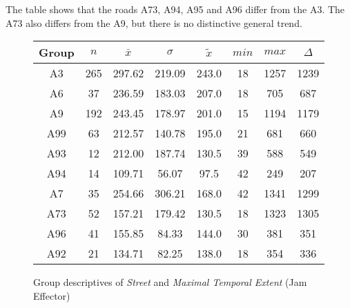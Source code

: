 The table shows that the roads A73, A94, A95 and A96 differ from the A3. The A73 also differs from the A9, but there is no distinctive general trend.
\begin{figure}[ht!]
	\centering
	\begin{minipage}{0.5\textwidth}
		\tiny
		\setlength{\tabcolsep}{4pt}
		\centering
		\begin{tabular}{c|c|c|c|c|c|c|c}
			\toprule
			Group & $n$ & $\bar{x}$ & $\sigma$ & $\tilde{x}$ & $min$ & $max$ & $\Delta$ \\
			\midrule
			A3   & 265 & 297.62 & 219.09 & 243.0 & 18 & 1257 & 1239 \\ 
			A6   & 37  & 236.59 & 183.03 & 207.0 & 18 & 705  & 687  \\ 
			A9   & 192 & 243.45 & 178.97 & 201.0 & 15 & 1194 & 1179 \\ 
			A99  & 63  & 212.57 & 140.78 & 195.0 & 21 & 681  & 660  \\ 
			A93  & 12  & 212.00 & 187.74 & 130.5 & 39 & 588  & 549  \\ 
			A94  & 14  & 109.71 & 56.07  & 97.5  & 42 & 249  & 207  \\ 
			A7   & 35  & 254.66 & 306.21 & 168.0 & 42 & 1341 & 1299 \\ 
			A73  & 52  & 157.21 & 179.42 & 130.5 & 18 & 1323 & 1305 \\ 
			A96  & 41  & 155.85 & 84.33  & 144.0 & 30 & 381  & 351  \\ 
			A92  & 21  & 134.71 & 82.25  & 138.0 & 18 & 354  & 336  \\ 
			\bottomrule
		\end{tabular}
		\label{tbl:descriptives_baysis_effector_Street_TMax}
	\end{minipage}%
	\begin{minipage}{0.55\textwidth}
		\data
        \pgfplotstablesort[sort key=mean, sort cmp=float >]{\datasorted}{\data}
        \tiny
        \centering
		\label{fig:descriptives_baysis_effector_Street_TMax}
	\end{minipage}%
	\caption{Group descriptives of \textit{Street} and \textit{Maximal Temporal Extent} (Jam Effector)}
\end{figure}
